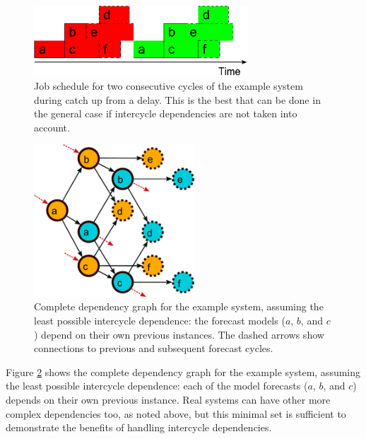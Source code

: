 \documentclass[11pt,a4paper]{article}
\begin{document}
\begin{figure}
    \begin{center}
        \includegraphics[width=8cm]{timeline-one-a}
    \end{center}
    \caption{\small Job schedule for two consecutive cycles of the
    example system during catch up from a delay. This is the best
    that can be done in the general case if intercycle dependencies
    are not taken into account.}
    \label{fig-time-one-a}
\end{figure}

\begin{figure} \begin{center}
    \includegraphics[width=6cm]{dependencies-two} \end{center}
    \caption{\small Complete dependency graph for the example
    system, assuming the least possible intercycle dependence: the
    forecast models ($a$, $b$, and $c$) depend on their own previous
    instances. The dashed arrows show connections to previous and
    subsequent forecast cycles.} 
    \label{fig-dep-two}
\end{figure}

Figure \ref{fig-dep-two} shows the complete dependency graph for the
example system, assuming the least possible intercycle dependence: each
of the model forecasts ($a$, $b$, and $c$) depends on their own previous
instance. Real systems can have other more complex dependencies too, as
noted above, but this minimal set is sufficient to demonstrate the
benefits of handling intercycle dependencies.
\end{document}
